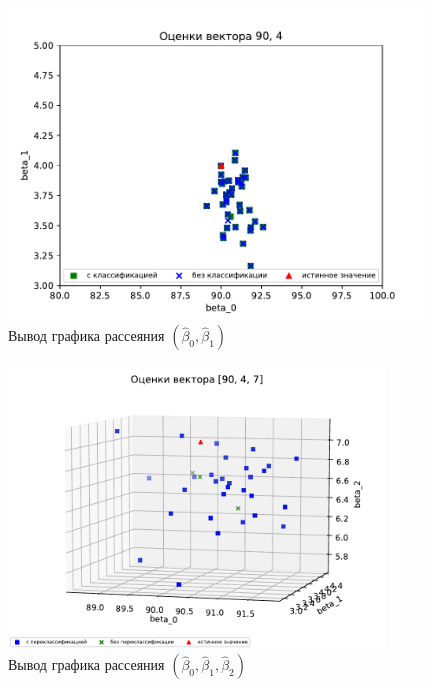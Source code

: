 \begin{figure}[h]
    \centering
    \includegraphics[width=110mm]{../images/plot_90_4_with-without_(3).pdf}
    \caption{Вывод графика рассеяния $(\hat{\beta}_0,\hat{\beta}_1)$\label{overflow}}
    \label{pic4}
\end{figure}

\begin{figure}[h]
    \centering
    \includegraphics[width=100mm]{../images/plot_90_4_7_(4).pdf}
    \caption{Вывод графика рассеяния $(\hat{\beta}_0,\hat{\beta}_1, \hat{\beta}_2)$\label{overflow}}
    \label{pic5}
\end{figure}

\newpage
